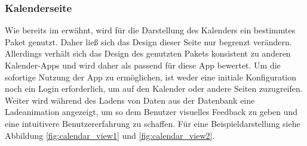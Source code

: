 \subsubsection{Kalenderseite}%
Wie bereits im  erwähnt, wird für die Darstellung des Kalenders ein bestimmtes Paket genutzt. Daher ließ sich das Design dieser Seite nur begrenzt verändern. Allerdings verhält sich das Design des genutzten Pakets konsistent zu anderen Kalender-Apps und wird daher als passend für diese App bewertet.\newline%
Um die sofortige Nutzung der App zu ermöglichen, ist weder eine initiale Konfiguration noch ein Login erforderlich, um auf den Kalender oder andere Seiten zuzugreifen. Weiter wird während des Ladens von Daten aus der Datenbank eine Ladeanimation angezeigt, um so dem Benutzer visuelles Feedback zu geben und eine intuitivere Benutzererfahrung zu schaffen. 
\newline%
Für eine Beispieldarstellung siehe Abbildung \ref{fig:calendar_view1} und \ref{fig:calendar_view2}.
%


